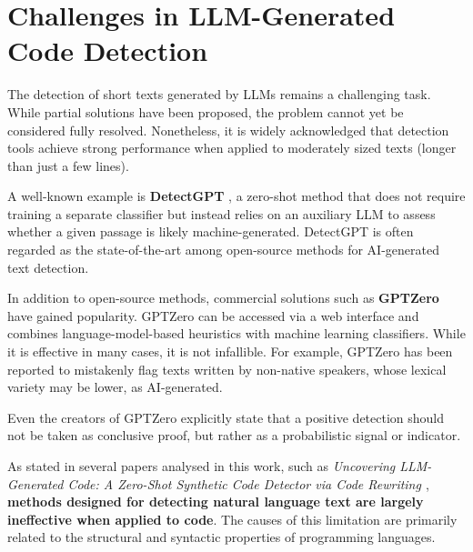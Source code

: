 \clearpage
\section{Challenges in LLM-Generated Code Detection}
\label{sec:Challenges in LLM-Generated Code Detection}
The detection of short texts generated by LLMs remains 
a challenging task. While partial solutions have been 
proposed, the problem cannot yet be considered fully 
resolved. Nonetheless, it is widely acknowledged that 
detection tools achieve strong performance when applied 
to moderately sized texts (longer than just a few lines).

A well-known example is \textbf{DetectGPT}
\cite{mitchell2023detectgpt}, a 
zero-shot method that does not require training a 
separate classifier but instead relies on an 
auxiliary LLM to assess whether a given passage is 
likely machine-generated. 
DetectGPT is often regarded as the state-of-the-art 
among open-source methods for AI-generated text detection.


In addition to open-source methods, commercial 
solutions such as \textbf{GPTZero} \cite{GPTZeroMethodology2023}
have gained 
popularity. GPTZero can be accessed via a web 
interface and combines language-model-based heuristics 
with machine learning classifiers. While it is 
effective in many cases, it is not infallible. 
For example, GPTZero has been reported to mistakenly 
flag texts written by non-native speakers, 
whose lexical variety may be lower, as AI-generated.

Even the creators of GPTZero explicitly state 
that a positive detection should not be taken as 
conclusive proof, but rather as a probabilistic 
signal or indicator.

\vspace{1\baselineskip}
\noindent

As stated in several papers analysed in this work, 
such as \textit{Uncovering LLM-Generated Code: A 
Zero-Shot Synthetic Code Detector via Code Rewriting 
\cite{ye2023uncovering}}, \textbf{methods designed for 
detecting natural language text are largely 
ineffective when applied to code}. The causes of 
this limitation are primarily related to the 
structural and syntactic properties of programming 
languages. 

